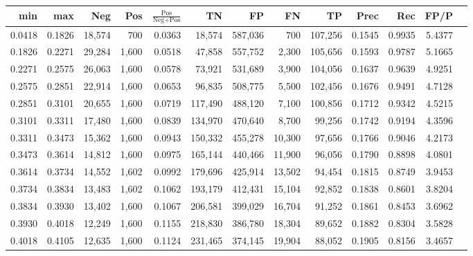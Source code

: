 \begin{tabular}{rrrrrrrrrrrrr}
\toprule
   min &    max &    Neg &   Pos & $\frac{\text{Pos}}{\text{Neg}+\text{Pos}}$ &      TN &      FP &      FN &      TP &   Prec &    Rec &   FP/P \\
\midrule
0.0418 & 0.1826 & 18,574 &   700 &                                     0.0363 &  18,574 & 587,036 &     700 & 107,256 & 0.1545 & 0.9935 & 5.4377 \\
0.1826 & 0.2271 & 29,284 & 1,600 &                                     0.0518 &  47,858 & 557,752 &   2,300 & 105,656 & 0.1593 & 0.9787 & 5.1665 \\
0.2271 & 0.2575 & 26,063 & 1,600 &                                     0.0578 &  73,921 & 531,689 &   3,900 & 104,056 & 0.1637 & 0.9639 & 4.9251 \\
0.2575 & 0.2851 & 22,914 & 1,600 &                                     0.0653 &  96,835 & 508,775 &   5,500 & 102,456 & 0.1676 & 0.9491 & 4.7128 \\
0.2851 & 0.3101 & 20,655 & 1,600 &                                     0.0719 & 117,490 & 488,120 &   7,100 & 100,856 & 0.1712 & 0.9342 & 4.5215 \\
0.3101 & 0.3311 & 17,480 & 1,600 &                                     0.0839 & 134,970 & 470,640 &   8,700 &  99,256 & 0.1742 & 0.9194 & 4.3596 \\
0.3311 & 0.3473 & 15,362 & 1,600 &                                     0.0943 & 150,332 & 455,278 &  10,300 &  97,656 & 0.1766 & 0.9046 & 4.2173 \\
0.3473 & 0.3614 & 14,812 & 1,600 &                                     0.0975 & 165,144 & 440,466 &  11,900 &  96,056 & 0.1790 & 0.8898 & 4.0801 \\
0.3614 & 0.3734 & 14,552 & 1,602 &                                     0.0992 & 179,696 & 425,914 &  13,502 &  94,454 & 0.1815 & 0.8749 & 3.9453 \\
0.3734 & 0.3834 & 13,483 & 1,602 &                                     0.1062 & 193,179 & 412,431 &  15,104 &  92,852 & 0.1838 & 0.8601 & 3.8204 \\
0.3834 & 0.3930 & 13,402 & 1,600 &                                     0.1067 & 206,581 & 399,029 &  16,704 &  91,252 & 0.1861 & 0.8453 & 3.6962 \\
0.3930 & 0.4018 & 12,249 & 1,600 &                                     0.1155 & 218,830 & 386,780 &  18,304 &  89,652 & 0.1882 & 0.8304 & 3.5828 \\
0.4018 & 0.4105 & 12,635 & 1,600 &                                     0.1124 & 231,465 & 374,145 &  19,904 &  88,052 & 0.1905 & 0.8156 & 3.4657 \\

\end{tabular}
